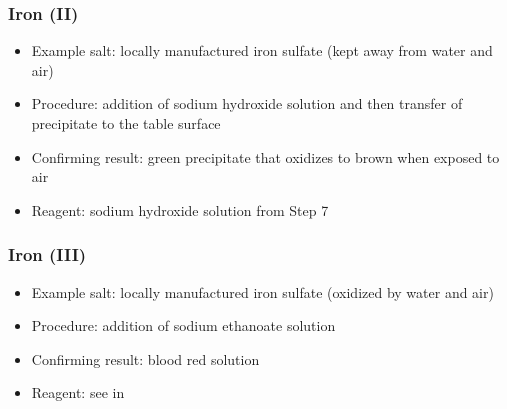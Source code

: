 \subsubsection{Iron (II)}
\begin{itemize}
\item{Example salt: locally manufactured iron sulfate 
(kept away from water and air)}
\item{Procedure: addition of sodium hydroxide solution 
and then transfer of precipitate to the table surface}
\item{Confirming result: green precipitate 
that oxidizes to brown when exposed to air}
\item{Reagent: sodium hydroxide solution from Step 7}
\end{itemize}

\subsubsection{Iron (III)}
\begin{itemize}
\item{Example salt: locally manufactured iron sulfate 
(oxidized by water and air)}
\item{Procedure: addition of sodium ethanoate solution}
\item{Confirming result: blood red solution}
\item{Reagent: see  in }
\end{itemize}

